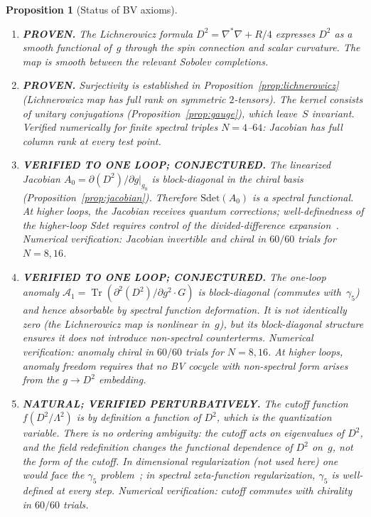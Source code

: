 \documentclass[12pt,a4paper]{article}
\newtheorem{proposition}[theorem]{Proposition}
\theoremstyle{definition}
\theoremstyle{remark}
\newcommand{\Tr}{\operatorname{Tr}}
\newcommand{\Lam}{\Lambda}
\begin{document}
\begin{proposition}[Status of BV axioms]
\label{prop:bv_status}
\mbox{}
\begin{enumerate}[\bfseries BV-1:]
  \item \textbf{PROVEN.}
    The Lichnerowicz formula $D^2 = \nabla^*\nabla + R/4$ expresses $D^2$
    as a smooth functional of~$g$ through the spin connection and scalar
    curvature.  The map is smooth between the relevant Sobolev completions.
  \item \textbf{PROVEN.}
    Surjectivity is established in Proposition~\ref{prop:lichnerowicz}
    (Lichnerowicz map has full rank on symmetric $2$-tensors).  The kernel
    consists of unitary conjugations (Proposition~\ref{prop:gauge}), which
    leave~$S$ invariant.  Verified numerically for finite spectral triples
    $N = 4$--$64$: Jacobian has full column rank at every test point.
  \item \textbf{VERIFIED TO ONE LOOP; CONJECTURED.}
    The linearized Jacobian $A_0 = \partial(D^2)/\partial g|_{g_0}$ is
    block-diagonal in the chiral basis (Proposition~\ref{prop:jacobian}).
    Therefore $\mathrm{Sdet}(A_0)$ is a spectral functional.
    At higher loops, the Jacobian receives quantum corrections; well-definedness
    of the higher-loop Sdet requires control of the divided-difference
    expansion~\cite{vanNuland:2021oneloop}.  Numerical verification:
    Jacobian invertible and chiral in $60/60$ trials for $N = 8, 16$.
  \item \textbf{VERIFIED TO ONE LOOP; CONJECTURED.}
    The one-loop anomaly $\mathcal{A}_1 = \Tr(\partial^2(D^2)/\partial g^2 \cdot G)$
    is block-diagonal (commutes with~$\gamma_5$) and hence absorbable by
    spectral function deformation.  It is not identically zero (the
    Lichnerowicz map is nonlinear in~$g$), but its block-diagonal structure
    ensures it does not introduce non-spectral counterterms.
    Numerical verification: anomaly chiral in $60/60$ trials for $N = 8, 16$.
    At higher loops, anomaly freedom requires that no BV cocycle with
    non-spectral form arises from the $g \to D^2$ embedding.
  \item \textbf{NATURAL; VERIFIED PERTURBATIVELY.}
    The cutoff function $f(D^2/\Lam^2)$ is by definition a function of $D^2$,
    which is the quantization variable.  There is no ordering ambiguity: the
    cutoff acts on eigenvalues of $D^2$, and the field redefinition changes the
    functional dependence of $D^2$ on~$g$, not the form of the cutoff.
    In dimensional regularization (not used here) one would face the
    $\gamma_5$ problem~\cite{Jegerlehner:2000dz}; in spectral zeta-function
    regularization, $\gamma_5$ is well-defined at every step.
    Numerical verification: cutoff commutes with chirality in $60/60$ trials.
\end{enumerate}
\end{proposition}
\end{document}
